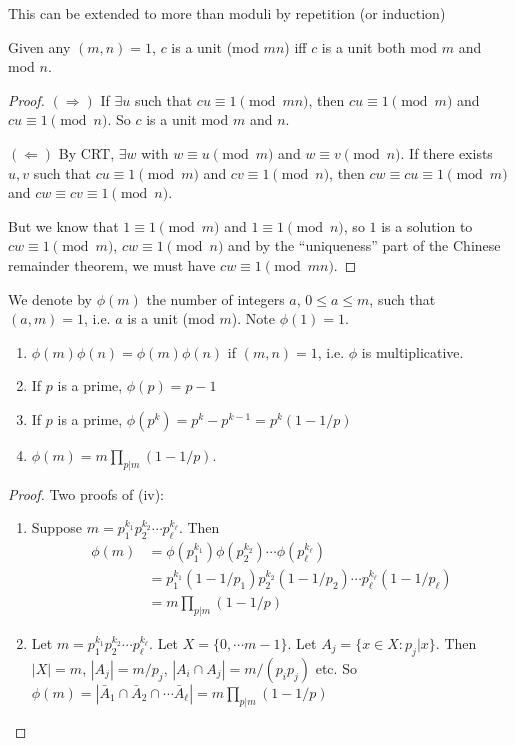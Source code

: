 \documentclass[a4paper]{article}
\begin{document}
  \note This can be extended to more than moduli by repetition (or induction)

  \begin{prop}
    Given any $(m,n) = 1$, $c$ is a unit (mod $mn$) iff $c$ is a unit both mod $m$ and mod $n$.
  \end{prop}

  \begin{proof}
    $(\Rightarrow)$ If $\exists u$ such that $cu \equiv 1 \pmod {mn}$, then $cu \equiv 1\pmod m$ and $cu\equiv 1\pmod n$. So $c$ is a unit mod $m$ and $n$.

    $(\Leftarrow)$ By CRT, $\exists w$ with $w\equiv u \pmod m$  and $w\equiv v\pmod n$. If there exists $u, v$ such that $cu\equiv 1\pmod m$ and $cv \equiv 1\pmod n$, then $cw\equiv cu\equiv 1\pmod m$ and $cw\equiv cv\equiv 1\pmod n$.

    But we know that $1\equiv 1\pmod m$ and $1\equiv 1\pmod n$, so $1$ is a solution to $cw \equiv 1\pmod m$, $cw\equiv 1\pmod n$ and by the ``uniqueness'' part of the Chinese remainder theorem, we must have $cw\equiv 1\pmod {mn}$.
  \end{proof}

  \begin{defi}
    We denote by $\phi(m)$ the number of integers $a$, $0\leq a\leq m$, such that $(a, m) = 1$, i.e. $a$ is a unit (mod $m$). Note $\phi(1) = 1$.
  \end{defi}

  \begin{prop}\leavevmode
    \begin{enumerate}
      \item $\phi(m)\phi(n) = \phi(m)\phi(n)$ if $(m, n) = 1$, i.e. $\phi$ is multiplicative.
      \item If $p$ is a prime, $\phi(p) = p - 1$
      \item If $p$ is a prime, $\phi(p^k) = p^k - p^{k - 1} = p^k(1 - 1/p)$
      \item $\phi(m) = m\prod_{p | m}(1 - 1/p)$.
    \end{enumerate}
  \end{prop}

  \begin{proof}
    Two proofs of (iv):
    \begin{enumerate}
      \item Suppose $m = p_1^{k_1}p_2^{k_2}\cdots p_\ell^{k_\ell}$. Then 
        \begin{align*}
          \phi(m) &= \phi(p_1^{k_1})\phi(p_2^{k_2})\cdots \phi(p_\ell^{k_\ell})\\
          &= p_1^{k_1}(1-1/p_1)p_2^{k_2}(1 - 1/p_2)\cdots p_\ell^{k_\ell}(1 - 1/p_\ell)\\
          &= m\prod_{p | m}(1 - 1/p)
        \end{align*}
      \item Let $m = p_1^{k_1}p_2^{k_2}\cdots p_\ell^{k_\ell}$. Let $X = \{0, \cdots m - 1\}$. Let $A_j = \{x\in X: p_j|x\}$. Then $|X| = m$, $|A_j| = m/p_j$, $|A_i\cap A_j| = m/(p_ip_j)$ etc. So $\phi(m) = |\bar A_1\cap \bar A_2\cap \cdots \bar A_\ell| = m\prod_{p | m}(1 - 1/p)$
    \end{enumerate}
  \end{proof}
\end{document}
